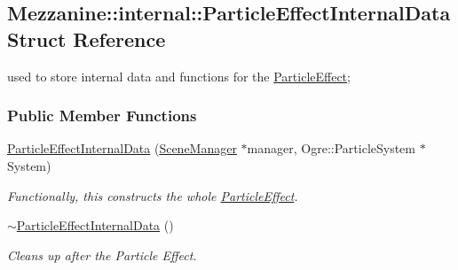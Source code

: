 \hypertarget{structMezzanine_1_1internal_1_1ParticleEffectInternalData}{
\subsection{Mezzanine::internal::ParticleEffectInternalData Struct Reference}
\label{structMezzanine_1_1internal_1_1ParticleEffectInternalData}
}


used to store internal data and functions for the \hyperlink{classMezzanine_1_1ParticleEffect}{ParticleEffect};  


\subsubsection*{Public Member Functions}
\begin{DoxyCompactItemize}
\item 
\hypertarget{structMezzanine_1_1internal_1_1ParticleEffectInternalData_a1fe6a28e1cd355217679db1f20566c5d}{
\hyperlink{structMezzanine_1_1internal_1_1ParticleEffectInternalData_a1fe6a28e1cd355217679db1f20566c5d}{ParticleEffectInternalData} (\hyperlink{classMezzanine_1_1SceneManager}{SceneManager} $\ast$manager, Ogre::ParticleSystem $\ast$System)}
\label{structMezzanine_1_1internal_1_1ParticleEffectInternalData_a1fe6a28e1cd355217679db1f20566c5d}

\begin{DoxyCompactList}\small\item\em Functionally, this constructs the whole \hyperlink{classMezzanine_1_1ParticleEffect}{ParticleEffect}. \item\end{DoxyCompactList}\item 
\hypertarget{structMezzanine_1_1internal_1_1ParticleEffectInternalData_a4ccbbc3703888b8f18973062f178840f}{
\hyperlink{structMezzanine_1_1internal_1_1ParticleEffectInternalData_a4ccbbc3703888b8f18973062f178840f}{$\sim$ParticleEffectInternalData} ()}
\label{structMezzanine_1_1internal_1_1ParticleEffectInternalData_a4ccbbc3703888b8f18973062f178840f}

\begin{DoxyCompactList}\small\item\em Cleans up after the Particle Effect. \item\end{DoxyCompactList}\end{DoxyCompactItemize}
